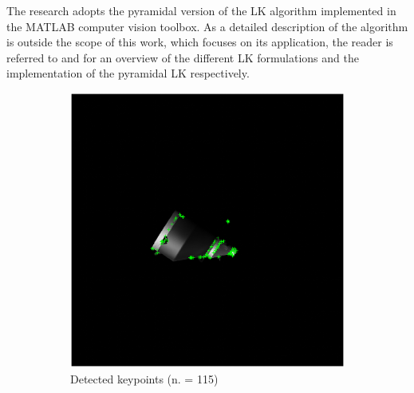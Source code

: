 The research adopts the pyramidal version of the LK algorithm implemented in the MATLAB computer vision toolbox. As a detailed description of the algorithm is outside the scope of this work, which focuses on its application, the reader is referred to \cite{baker2004lucas} and \cite{bouguet2001pyramidal} for an overview of the different LK formulations and the implementation of the pyramidal LK respectively.\\
\begin{figure}[!ht]
     \centering
     \begin{subfigure}[b]{0.32\textwidth}
         \centering
         \includegraphics[clip,trim= 6cm 6cm 6cm 6cm,width=\textwidth]{Images/t0.eps}
         \caption{Detected keypoints \quad \mbox{} \quad \quad (n. = 115)}
         \label{fig:t0}
     \end{subfigure}
     \hfill
     \begin{subfigure}[b]{0.32\textwidth}
         \centering

\end{subfigure}
\end{figure}
